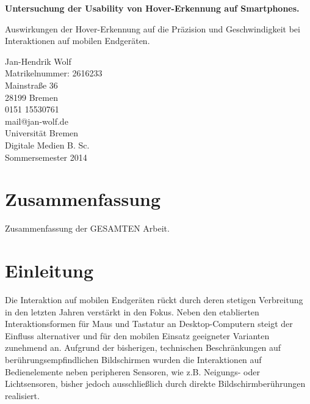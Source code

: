 \documentclass[a4paper,12pt,bibliography=totoc]{scrreprt}%
\begin{document}
\begin{titlepage}
\begin{center}
\null
\vfill
\begin{Large}
\textsf{\textbf{Untersuchung der Usability von Hover-Erkennung auf Smartphones.}}
\end{Large}\linebreak \linebreak 
\begin{large}
\textsf{Auswirkungen der Hover-Erkennung auf die Präzision und Geschwindigkeit bei Interaktionen auf mobilen Endgeräten.}
\end{large}
\begin{small}
\vfill{Jan-Hendrik Wolf \\ Matrikelnummer: 2616233 \\ Mainstraße 36 \\  28199 Bremen \\ 0151 15530761\\ mail@jan-wolf.de \\\vspace{3cm} Universität Bremen\\ Digitale Medien B. Sc. \\ Sommersemester 2014}
\null
\end{small}
\end{center}
\end{titlepage}

\tableofcontents
\thispagestyle{empty}
\clearpage
\onehalfspacing
\pagestyle{plain}

\chapter{Zusammenfassung}
Zusammenfassung der GESAMTEN Arbeit.

\chapter{Einleitung}
Die Interaktion auf mobilen Endgeräten rückt durch deren stetigen Verbreitung in den letzten Jahren verstärkt in den Fokus. Neben den etablierten Interaktionsformen für Maus und Tastatur an Desktop-Computern steigt der Einfluss alternativer und für den mobilen Einsatz geeigneter Varianten zunehmend an.
Aufgrund der bisherigen, technischen Beschränkungen auf berührungsempfindlichen Bildschirmen wurden die Interaktionen auf Bedienelemente neben peripheren Sensoren, wie z.B. Neigungs- oder Lichtsensoren, bisher jedoch ausschließlich durch direkte Bildschirmberührungen realisiert.
\end{document}
